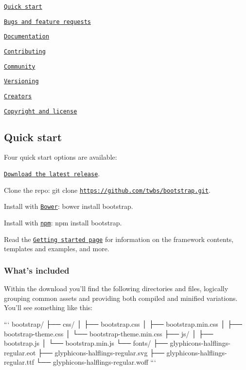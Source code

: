 \begin{DoxyItemize}
\item \href{#quick-start}{\tt Quick start}
\item \href{#bugs-and-feature-requests}{\tt Bugs and feature requests}
\item \href{#documentation}{\tt Documentation}
\item \href{#contributing}{\tt Contributing}
\item \href{#community}{\tt Community}
\item \href{#versioning}{\tt Versioning}
\item \href{#creators}{\tt Creators}
\item \href{#copyright-and-license}{\tt Copyright and license}
\end{DoxyItemize}

\subsection*{Quick start}

Four quick start options are available\-:


\begin{DoxyItemize}
\item \href{https://github.com/twbs/bootstrap/archive/v3.3.1.zip}{\tt Download the latest release}.
\item Clone the repo\-: {\ttfamily git clone \href{https://github.com/twbs/bootstrap.git}{\tt https\-://github.\-com/twbs/bootstrap.\-git}}.
\item Install with \href{http://bower.io}{\tt Bower}\-: {\ttfamily bower install bootstrap}.
\item Install with \href{https://www.npmjs.org}{\tt npm}\-: {\ttfamily npm install bootstrap}.
\end{DoxyItemize}

Read the \href{http://getbootstrap.com/getting-started/}{\tt Getting started page} for information on the framework contents, templates and examples, and more.

\subsubsection*{What's included}

Within the download you'll find the following directories and files, logically grouping common assets and providing both compiled and minified variations. You'll see something like this\-:

``` bootstrap/ ├── css/ │ ├── bootstrap.\-css │ ├── bootstrap.\-min.\-css │ ├── bootstrap-\/theme.\-css │ └── bootstrap-\/theme.\-min.\-css ├── js/ │ ├── bootstrap.\-js │ └── bootstrap.\-min.\-js └── fonts/ ├── glyphicons-\/halflings-\/regular.\-eot ├── glyphicons-\/halflings-\/regular.\-svg ├── glyphicons-\/halflings-\/regular.\-ttf └── glyphicons-\/halflings-\/regular.\-woff ```

